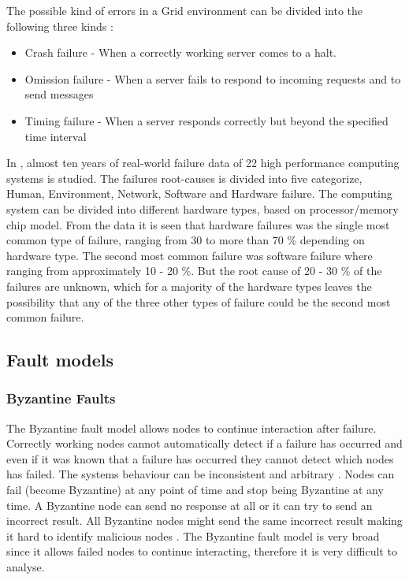 \documentclass{cslthse-msc}
\begin{document}
The possible kind of errors in a Grid environment can be divided into the following three kinds \cite{effTaskReplMobGrid}:
\begin{itemize}
	\item Crash failure - When a correctly working server comes to a halt.
	\item Omission failure - When a server fails to respond to incoming requests and to send messages
	\item Timing failure - When a server responds correctly but beyond the specified time interval
\end{itemize}

In \cite{studyOfFailures}, almost ten years of real-world failure data of 22 high performance computing systems is studied. The failures root-causes is divided into five categorize, Human, Environment, Network, Software and Hardware failure. The computing system can be divided into different hardware types, based on processor/memory chip model. From the data it is seen that hardware failures was the single most common type of failure, ranging from 30 to more than 70 \% depending on hardware type. The second most common failure was software failure where ranging from approximately 10 - 20 \%. But the root cause of 20 - 30 \% of the failures are unknown, which for a majority of the hardware types leaves the possibility that any of the three other types of failure could be the second most common failure.

\subsection{Fault models}
\subsubsection*{Byzantine Faults}
The Byzantine fault model allows nodes to continue interaction after failure. Correctly working nodes cannot automatically detect if a failure has occurred and even if it was known that a failure has occurred they cannot detect which nodes has failed. The systems behaviour can be inconsistent and arbitrary \cite{surveyFaultParallel}. Nodes can fail (become Byzantine) at any point of time and stop being Byzantine at any time. A Byzantine node can send no response at all or it can try to send an incorrect result. All Byzantine nodes might send the same incorrect result making it hard to identify malicious nodes \cite{selfAdaptRel}. %
The Byzantine fault model is very broad since it allows failed nodes to continue interacting, therefore it is very difficult to analyse.
\end{document}

